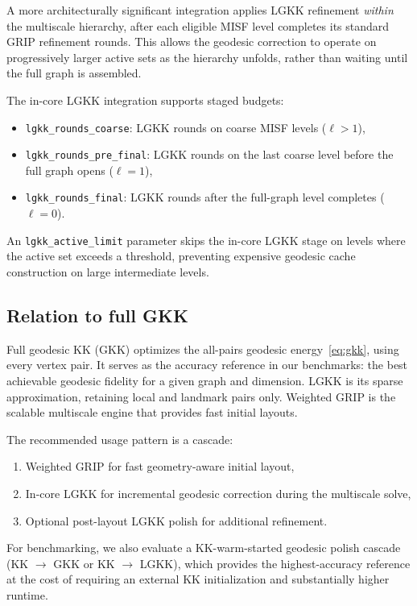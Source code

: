 \documentclass[11pt,twocolumn]{article}
\begin{document}
A more architecturally significant integration applies LGKK refinement
\emph{within} the multiscale hierarchy, after each eligible MISF level
completes its standard GRIP refinement rounds.  This allows the geodesic
correction to operate on progressively larger active sets as the
hierarchy unfolds, rather than waiting until the full graph is assembled.

The in-core LGKK integration supports staged budgets:
\begin{itemize}
\item \texttt{lgkk\_rounds\_coarse}: LGKK rounds on coarse MISF levels
  ($\ell > 1$),
\item \texttt{lgkk\_rounds\_pre\_final}: LGKK rounds on the last coarse
  level before the full graph opens ($\ell = 1$),
\item \texttt{lgkk\_rounds\_final}: LGKK rounds after the full-graph
  level completes ($\ell = 0$).
\end{itemize}

An \texttt{lgkk\_active\_limit} parameter skips the in-core LGKK stage
on levels where the active set exceeds a threshold, preventing expensive
geodesic cache construction on large intermediate levels.

\subsection{Relation to full GKK}

Full geodesic KK (GKK) optimizes the all-pairs geodesic
energy~\eqref{eq:gkk}, using every vertex pair.  It serves as the
accuracy reference in our benchmarks: the best achievable geodesic
fidelity for a given graph and dimension.  LGKK is its sparse
approximation, retaining local and landmark pairs only.  Weighted GRIP
is the scalable multiscale engine that provides fast initial layouts.

The recommended usage pattern is a cascade:
\begin{enumerate}
\item Weighted GRIP for fast geometry-aware initial layout,
\item In-core LGKK for incremental geodesic correction during the
  multiscale solve,
\item Optional post-layout LGKK polish for additional refinement.
\end{enumerate}

For benchmarking, we also evaluate a KK-warm-started geodesic polish
cascade (KK $\to$ GKK or KK $\to$ LGKK), which provides the
highest-accuracy reference at the cost of requiring an external KK
initialization and substantially higher runtime.
\end{document}
